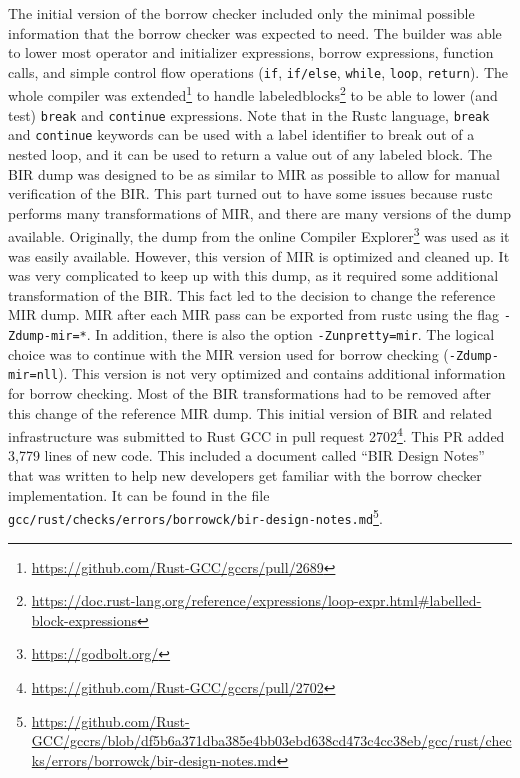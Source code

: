 \documentclass[
  11pt,
  twoside,symmetric]{report}
\DeclareRobustCommand{\href}[2]{#2\footnote{\url{#1}}}
\begin{document}
The initial version of the borrow checker included only the minimal
possible information that the borrow checker was expected to need. The
builder was able to lower most operator and initializer expressions,
borrow expressions, function calls, and simple control flow operations
(\texttt{if}, \texttt{if/else}, \texttt{while}, \texttt{loop},
\texttt{return}). The whole compiler was
\href{https://github.com/Rust-GCC/gccrs/pull/2689}{extended} to handle
labeled\href{https://doc.rust-lang.org/reference/expressions/loop-expr.html\#labelled-block-expressions}{blocks}
to be able to lower (and test) \texttt{break} and \texttt{continue}
expressions. Note that in the Rustc language, \texttt{break} and
\texttt{continue} keywords can be used with a label identifier to break
out of a nested loop, and it can be used to return a value out of any
labeled block. The BIR dump was
designed to be as similar to MIR as possible to allow for manual
verification of the BIR. This part turned out to have some issues
because rustc performs many transformations of MIR, and there are many
versions of the dump available. Originally, the dump from the online
\href{https://godbolt.org/}{Compiler Explorer} was used as it was easily
available. However, this version of MIR is optimized and cleaned up. It
was very complicated to keep up with this dump, as it required some
additional transformation of the BIR. This fact led to the decision to
change the reference MIR dump. MIR after each MIR pass can be exported
from rustc using the flag \texttt{-Zdump-mir=*}. In addition, there is
also the option \texttt{-Zunpretty=mir}. The logical choice was to
continue with the MIR version used for borrow checking
(\texttt{-Zdump-mir=nll}). This version is not very optimized and
contains additional information for borrow checking. Most of the BIR
transformations had to be removed after this change of the reference MIR
dump. This initial version of BIR and related infrastructure was
submitted to Rust GCC in
\href{https://github.com/Rust-GCC/gccrs/pull/2702}{pull request 2702}.
This PR added 3,779 lines of new code. This included a document called
``BIR Design Notes'' that was written to help new developers get
familiar with the borrow checker implementation. It can be found in the
file
\href{https://github.com/Rust-GCC/gccrs/blob/df5b6a371dba385e4bb03ebd638cd473c4cc38eb/gcc/rust/checks/errors/borrowck/bir-design-notes.md}{\texttt{gcc/rust/checks/errors/borrowck/bir-design-notes.md}}.
\end{document}

